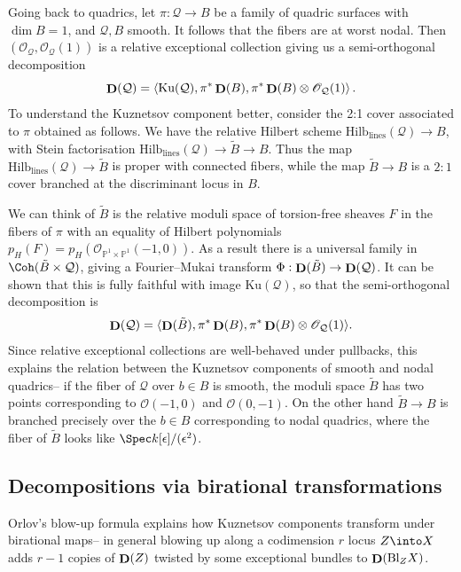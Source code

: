 Going back to quadrics, let \(\pi:\mathcal{Q}\to B\) be a family of quadric
surfaces with \(\dim B = 1\), and \(\mathcal{Q}, B\) smooth. It follows that the
fibers are at worst nodal. Then \((\mathscr{O}_{\mathcal{Q}},
\mathscr{O}_{\mathcal{Q}}(1))\) is a relative exceptional collection giving us a
semi-orthogonal decomposition
\[
    \mathop{\mathbf{D}}(\mathcal{Q})=\left\langle \text{Ku}(\mathcal{Q}), \pi^\ast \mathop{\mathbf{D}}(B),
    \pi^\ast \mathop{\mathbf{D}}(B)\otimes \mathscr{O}_{\mathcal{Q}}(1) \right\rangle.
\]
To understand the Kuznetsov component better, consider the 2:1 cover associated
to \(\pi\) obtained as follows. We have the relative Hilbert scheme
\(\text{Hilb}_\text{lines}(\mathcal{Q})\to B\), with Stein factorisation
\(\text{Hilb}_\text{lines}(\mathcal{Q})\to \tilde B\to B\). Thus the map
\(\text{Hilb}_\text{lines}(\mathcal{Q})\to \tilde B\) is proper with connected
fibers, while the map \(\tilde B\to B\) is a \(2:1\) cover branched at the
discriminant locus in \(B\).

We can think of \(\tilde B\) is the relative moduli space of torsion-free
sheaves \(F\) in the fibers of \(\pi\) with an equality of Hilbert polynomials \( p_H(F)=p_H(\mathscr{O}_{\mathbb{P}^1\times \mathbb{P}^1}(-1,0)).\)
As a result there is a universal family in \(\Coh(\tilde B \times
\mathcal{Q})\), giving a Fourier--Mukai transform \(\Phi:\mathop{\mathbf{D}}(\tilde B)\to
\mathop{\mathbf{D}}(\mathcal{Q})\). It can be shown that this is fully faithful with image
\(\text{Ku}(\mathcal{Q})\), so that the semi-orthogonal decomposition is
\[
    \mathop{\mathbf{D}}(\mathcal{Q})=\langle \mathop{\mathbf{D}}(\tilde B), \pi^\ast \mathop{\mathbf{D}}(B), \pi^\ast
    \mathop{\mathbf{D}}(B)\otimes \mathscr{O}_{\mathcal{Q}}(1) \rangle.
\]
Since relative exceptional collections are well-behaved under pullbacks, this
explains the relation between the Kuznetsov components of smooth and nodal
quadrics-- if the fiber of \(\mathcal{Q}\) over \(b\in B\) is smooth, the
moduli space \(\tilde B\) has two points corresponding to \(\mathscr{O}(-1,0)\)
and \(\mathscr{O}(0,-1)\). On the other hand \(\tilde B\to B\) is branched
precisely over the \(b\in B\) corresponding to nodal quadrics, where the fiber
of \(\tilde B\) looks like \(\Spec k[\epsilon]/(\epsilon^2)\).

\subsection{Decompositions via birational transformations} Orlov's blow-up
formula explains how Kuznetsov components transform under birational maps-- in
general blowing up along a codimension \(r\) locus \(Z\into X\) adds \(r-1\)
copies of \(\mathop{\mathbf{D}}(Z)\) twisted by some exceptional bundles to \(\mathop{\mathbf{D}}(\text{Bl}_ZX)\).

